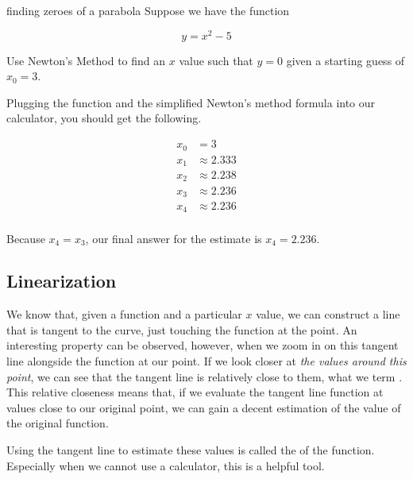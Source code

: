 \begin{example}{finding zeroes of a parabola}
    Suppose we have the function
    
    \[ y = x^2 - 5 \]
    
    Use Newton's Method to find an \( x \) value such that \( y = 0 \) given a starting guess of \( x_0 = 3 \).
    
    \vspace{0.3cm}
    
    Plugging the function and the simplified Newton's method formula into our calculator, you should get the following.
    
    \begin{align*}
        x_0 &= 3 \\
        x_1 &\approx 2.333 \\
        x_2 &\approx 2.238 \\
        x_3 &\approx 2.236 \\
        x_4 &\approx 2.236 \\
    \end{align*}
    
    Because \( x_4 = x_3 \), our final answer for the estimate is \( x_4 = 2.236 \).
\end{example}

\subsection{Linearization}

We know that, given a function and a particular \( x \) value, we can construct a line that is tangent to the curve, just touching the function at the point. An interesting property can be observed, however, when we zoom in on this tangent line alongside the function at our point. If we look closer at \textit{the values around this point}, we can see that the tangent line is relatively close to them, what we term . This relative closeness means that, if we evaluate the tangent line function at values close to our original point, we can gain a decent estimation of the value of the original function.

\begin{figure}[H]
    \centering
    
\end{figure}

Using the tangent line to estimate these values is called the  of the function. Especially when we cannot use a calculator, this is a helpful tool.

